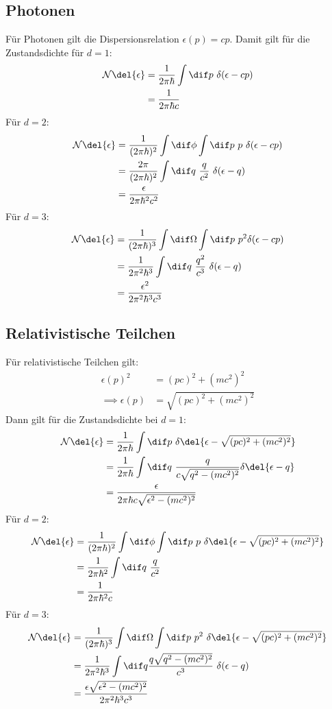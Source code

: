 \subsection{Photonen}
Für Photonen gilt die Dispersionsrelation $\epsilon(p)=cp$. Damit gilt für die Zustandsdichte für $d=1$:
\begin{align*}
\mathcal{N}\del{\epsilon} &= \frac{1}{2\pi\hbar} \int \dif p\ \delta(\epsilon - cp) \\
&=\frac{1}{2\pi\hbar c}
\end{align*}
Für $d=2$:
\begin{align*}
\mathcal{N}\del{\epsilon} &= \frac{1}{(2\pi\hbar)^2} \int \dif \phi \int \dif p \ p \ \delta(\epsilon-cp) \\
&=\frac{2\pi}{(2\pi\hbar)^2} \int \dif q \ \frac{q}{c^2} \  \delta(\epsilon-q) \\
&=\frac{\epsilon}{2\pi\hbar^2 c^2}
\end{align*}
Für $d=3$:
\begin{align*}
\mathcal{N}\del{\epsilon} &= \frac{1}{(2\pi\hbar)^3} \int \dif \Omega \int \dif p \ p^2 \delta(\epsilon-cp) \\
&= \frac{1}{2\pi^2\hbar^3} \int \dif q \ \frac{q^2}{c^3} \  \delta(\epsilon-q) \\
&=\frac{\epsilon^2}{2\pi^2\hbar^3c^3}
\end{align*}

\subsection{Relativistische Teilchen}
Für relativistische Teilchen gilt:
\begin{align*}
\epsilon(p)^2 &= (pc)^2+(mc^2)^2 \\
\implies \epsilon(p) &= \sqrt{(pc)^2+(mc^2)^2}
\end{align*}
Dann gilt für die Zustandsdichte bei $d=1$:
\begin{align*}
\mathcal{N}\del{\epsilon} &= \frac{1}{2\pi\hbar} \int \dif p \ \delta \del{\epsilon - \sqrt{(pc)^2+(mc^2)^2}} \\
&= \frac{1}{2\pi\hbar} \int \dif q \ \frac{q}{c\sqrt{q^2-(mc^2)^2}} \delta \del{\epsilon-q} \\
&= \frac{\epsilon}{2\pi\hbar c\sqrt{\epsilon^2-(mc^2)^2}}
\end{align*}
Für $d=2$: 
\begin{align*}
\mathcal{N}\del{\epsilon} &= \frac{1}{(2\pi\hbar)^2} \int \dif \phi \int \dif p \ p \ \delta \del{\epsilon - \sqrt{(pc)^2+(mc^2)^2}} \\
&= \frac{1}{2\pi\hbar^2} \int \dif q \ \frac{q}{c^2} \\
&= \frac{1}{2\pi\hbar^2 c}
\end{align*}
Für $d=3$:
\begin{align*}
\mathcal{N}\del{\epsilon} &= \frac{1}{(2\pi\hbar)^3} \int \dif \Omega \int \dif p \ p^2 \ \delta \del{\epsilon - \sqrt{(pc)^2+(mc^2)^2}} \\
&= \frac{1}{2\pi^2\hbar^3} \int \dif q \frac{q\sqrt{q^2-(mc^2)^2}}{c^3} \ \delta(\epsilon-q) \\
&= \frac{\epsilon\sqrt{\epsilon^2-(mc^2)^2}}{2\pi^2\hbar^3 c^3}
\end{align*}

